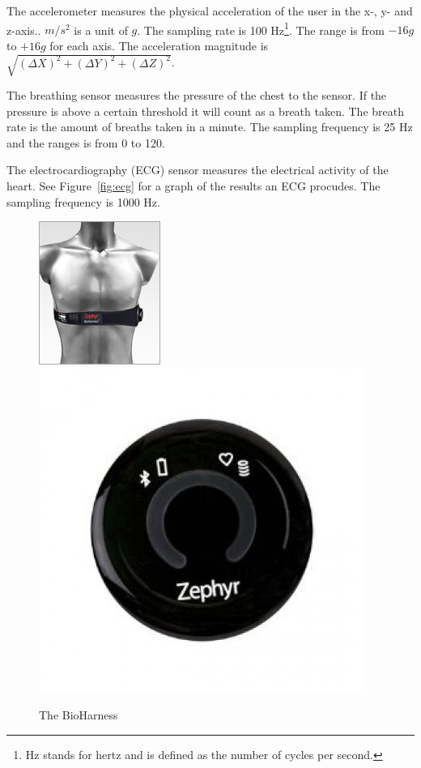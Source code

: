 			The accelerometer measures the physical acceleration of the user in the x-, y- and z-axis.. $m/s^2$ is a unit of $g$. The sampling rate is 100 Hz\footnote{Hz stands for hertz and is defined as the number of cycles per second.}. The range is from $-16g$ to $+16g$ for each axis. The acceleration magnitude is $\sqrt{(\Delta X)^2+(\Delta Y)^2+(\Delta Z)^2}$.

			The breathing sensor measures the pressure of the chest to the sensor. If the pressure is above a certain threshold it will count as a breath taken. The breath rate is the amount of breaths taken in a minute. The sampling frequency is 25 Hz and the ranges is from 0 to 120.

			The electrocardiography (ECG) sensor measures the electrical activity of the heart.\cite{ECG} See Figure~\ref{fig:ecg} for a graph of the results an ECG procudes. The sampling frequency is 1000 Hz.

			\begin{figure}[h]
				\centering
					\includegraphics[scale=2.0]{bh.jpg}
					\includegraphics[scale=0.25]{bhclose.jpg}
					
					\caption{The BioHarness}

			\end{figure}


